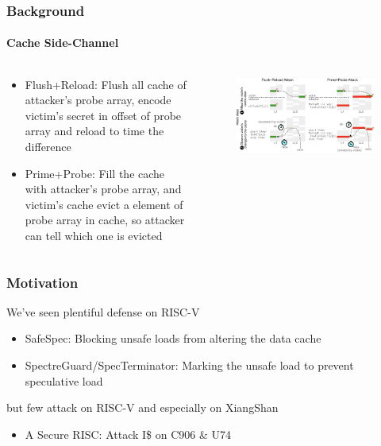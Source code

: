 \documentclass{beamer}
\begin{document}
\begin{frame}
    \frametitle{Background}
    \framesubtitle{Cache Side-Channel}
    \begin{columns}
        \begin{column}{0.5\textwidth}
            \begin{itemize}
                \item Flush+Reload: Flush all cache of attacker's probe array, encode victim's secret in offset of probe array and reload to time the difference
                \item Prime+Probe: Fill the cache with attacker's probe array, and victim's cache evict a element of probe array in cache, so attacker can tell which one is evicted
            \end{itemize}
        \end{column}
        \begin{column}{0.5\textwidth}
            \begin{figure}
                \centering
                \includegraphics[width=1\linewidth]{Figure/cache-attack.png}
            \end{figure}
        \end{column}
    \end{columns}
\end{frame}

\begin{frame}
    \frametitle{Motivation}
    We've seen plentiful defense on RISC-V
    \begin{itemize}
        \item SafeSpec\cite{safespec}: Blocking unsafe loads from altering the data cache
        \item SpectreGuard\cite{spectreguard}/SpecTerminator\cite{specterminator}: Marking the unsafe load to prevent speculative load
    \end{itemize}
    but few attack on RISC-V and especially on XiangShan
    \begin{itemize}
        \item A Secure RISC\cite{a-secure-risc}: Attack I\$ on C906 \& U74
    \end{itemize}
\end{frame}
\end{document}
